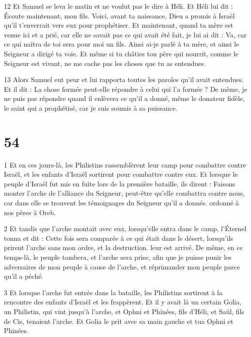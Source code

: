\par 12 Et Samuel se leva le matin et ne voulut pas le dire à Héli. Et Héli lui dit : Écoute maintenant, mon fils. Voici, avant ta naissance, Dieu a promis à Israël qu'il t'enverrait vers eux pour prophétiser. Et maintenant, quand ta mère est venue ici et a prié, car elle ne savait pas ce qui avait été fait, je lui ai dit : Va, car ce qui naîtra de toi sera pour moi un fils. Ainsi ai-je parlé à ta mère, et ainsi le Seigneur a dirigé ta voie. Et même si tu châties ton père qui nourrit, comme le Seigneur est vivant, ne me cache pas les choses que tu as entendues.

\par 13 Alors Samuel eut peur et lui rapporta toutes les paroles qu'il avait entendues. Et il dit : La chose formée peut-elle répondre à celui qui l'a formée ? De même, je ne puis pas répondre quand il enlèvera ce qu'il a donné, même le donateur fidèle, le saint qui a prophétisé, car je suis soumis à sa puissance.



\chapter{54}

\par 1 Et en ces jours-là, les Philistins rassemblèrent leur camp pour combattre contre Israël, et les enfants d'Israël sortirent pour combattre contre eux. Et lorsque le peuple d'Israël fut mis en fuite lors de la première bataille, ils dirent : Faisons monter l'arche de l'alliance du Seigneur, peut-être qu'elle combattra contre nous, car dans elle se trouvent les témoignages du Seigneur qu'il a donnés. ordonné à nos pères à Oreb.

\par 2 Et tandis que l'arche montait avec eux, lorsqu'elle entra dans le camp, l'Éternel tonna et dit : Cette fois sera comparée à ce qui était dans le désert, lorsqu'ils prirent l'arche sans mon ordre, et la destruction. leur est arrivé. De même, en ce temps-là, le peuple tombera, et l'arche sera prise, afin que je puisse punir les adversaires de mon peuple à cause de l'arche, et réprimander mon peuple parce qu'il a péché.

\par 3 Et lorsque l'arche fut entrée dans la bataille, les Philistins sortirent à la rencontre des enfants d'Israël et les frappèrent. Et il y avait là un certain Golia, un Philistin, qui vint jusqu'à l'arche, et Ophni et Phinées, fils d'Héli, et Saül, fils de Cis, tenaient l'arche. Et Golia le prit avec sa main gauche et tua Ophni et Phinées.

